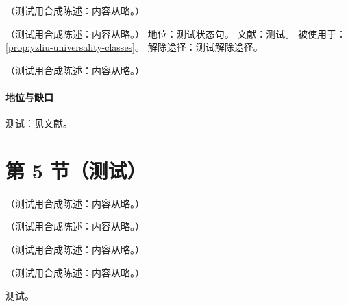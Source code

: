 \begin{example}\label{ex:yzliu-sI-rge}
（测试用合成陈述：内容从略。）
\end{example}

\begin{assumption}\label{asm:yzliu-lightcone-uniform}
（测试用合成陈述：内容从略。）
地位：测试状态句。
文献：测试。
被使用于：\cref{prop:yzliu-universality-classes}。
解除途径：测试解除途径。
\end{assumption}

\begin{proposition}\label{prop:yzliu-universality-classes}
（测试用合成陈述：内容从略。）
\end{proposition}
\paragraph{地位与缺口}测试：见文献。

\section{第 5 节（测试）}\label{sec:yzliu-time-ordering}

\begin{definition}[指数正规子下的软因子]\label{def:yzliu-exp-soft}
（测试用合成陈述：内容从略。）
\end{definition}

\begin{lemma}\label{lem:yzliu-matrix-tree}
（测试用合成陈述：内容从略。）
\end{lemma}

\begin{lemma}[末态求和恒等式]\label{lem:yzliu-final-state}
（测试用合成陈述：内容从略。）
\end{lemma}

\begin{theorem}\label{thm:yzliu-time-ordering}
（测试用合成陈述：内容从略。）
\end{theorem}
\begin{proofsketch}测试。\end{proofsketch}
